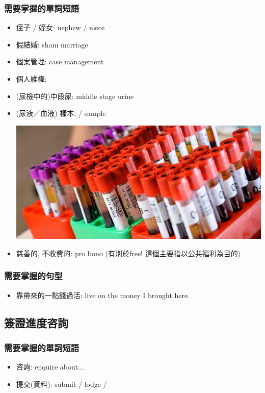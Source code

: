 \subsubsection*{需要掌握的單詞短語}
\begin{itemize}
  \itemsep0em
  \item 侄子 / 姪女: nephew / niece
  \item 假結婚: sham marriage
  \item 個案管理: case management
  \item 個人維權: 
  \item (尿檢中的)中段尿: middle stage urine
  \item (尿液／血液) 樣本:  / sample
  \begin{center}
    \includegraphics[scale=0.4]{pics/blood-sample}
  \end{center}
  \item 慈善的, 不收費的: pro bono (有別於free! 這個主要指以公共福利為目的)
\end{itemize}

\subsubsection*{需要掌握的句型}
\begin{itemize}
  \itemsep0em
  \item 靠帶來的一點錢過活: live on the money I brought here.
\end{itemize}

\subsection{簽證進度咨詢}
\subsubsection*{需要掌握的單詞短語}
\begin{itemize}
  \itemsep0em
  \item 咨詢: enquire about...
  \item 提交(資料): submit / lodge / 
\end{itemize}

